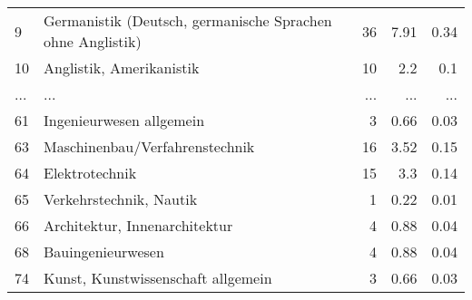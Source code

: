 \begin{longtable}{lXrrr}
        9 & \multicolumn{1}{X}{Germanistik (Deutsch, germanische Sprachen ohne Anglistik)} & %
          \num{36} &
          \num[round-mode=places,round-precision=2]{7.91} &
          \num[round-mode=places,round-precision=2]{0.34} \\
        10 & \multicolumn{1}{X}{Anglistik, Amerikanistik} & %
          \num{10} &
          \num[round-mode=places,round-precision=2]{2.2} &
          \num[round-mode=places,round-precision=2]{0.1} \\
       ... & ... & ... & ... & ... \\
        61 & \multicolumn{1}{X}{Ingenieurwesen allgemein} & %
          \num{3} &
          \num[round-mode=places,round-precision=2]{0.66} &
          \num[round-mode=places,round-precision=2]{0.03} \\

        63 & \multicolumn{1}{X}{Maschinenbau/Verfahrenstechnik} & %
          \num{16} &
          \num[round-mode=places,round-precision=2]{3.52} &
          \num[round-mode=places,round-precision=2]{0.15} \\

        64 & \multicolumn{1}{X}{Elektrotechnik} & %
          \num{15} &
          \num[round-mode=places,round-precision=2]{3.3} &
          \num[round-mode=places,round-precision=2]{0.14} \\

        65 & \multicolumn{1}{X}{Verkehrstechnik, Nautik} & %
          \num{1} &
          \num[round-mode=places,round-precision=2]{0.22} &
          \num[round-mode=places,round-precision=2]{0.01} \\

        66 & \multicolumn{1}{X}{Architektur, Innenarchitektur} & %
          \num{4} &
          \num[round-mode=places,round-precision=2]{0.88} &
          \num[round-mode=places,round-precision=2]{0.04} \\

        68 & \multicolumn{1}{X}{Bauingenieurwesen} & %
          \num{4} &
          \num[round-mode=places,round-precision=2]{0.88} &
          \num[round-mode=places,round-precision=2]{0.04} \\

        74 & \multicolumn{1}{X}{Kunst, Kunstwissenschaft allgemein} & %
          \num{3} &
          \num[round-mode=places,round-precision=2]{0.66} &
          \num[round-mode=places,round-precision=2]{0.03} \\


\end{longtable}
